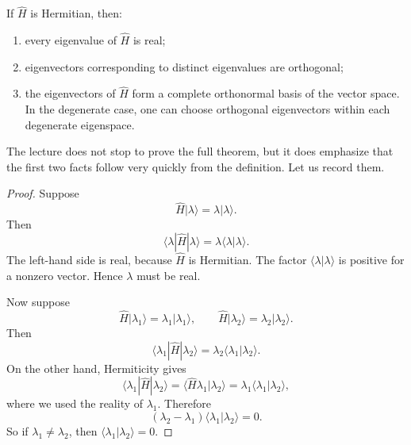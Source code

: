 \begin{theorem}
If \(\hat H\) is Hermitian, then:
\begin{enumerate}
\item every eigenvalue of \(\hat H\) is real;
\item eigenvectors corresponding to distinct eigenvalues are orthogonal;
\item the eigenvectors of \(\hat H\) form a complete orthonormal basis of the vector space. In the degenerate case, one can choose orthogonal eigenvectors within each degenerate eigenspace.
\end{enumerate}
\end{theorem}

The lecture does not stop to prove the full theorem, but it does emphasize that the first two facts follow very quickly from the definition. Let us record them.

\begin{proof}
Suppose
\begin{equation}
\hat H|\lambda\rangle=\lambda|\lambda\rangle.
\end{equation}
Then
\begin{equation}
\langle \lambda|\hat H|\lambda\rangle
=
\lambda \langle \lambda|\lambda\rangle.
\end{equation}
The left-hand side is real, because \(\hat H\) is Hermitian. The factor \(\langle \lambda|\lambda\rangle\) is positive for a nonzero vector. Hence \(\lambda\) must be real.

Now suppose
\begin{equation}
\hat H|\lambda_1\rangle=\lambda_1|\lambda_1\rangle,
\qquad
\hat H|\lambda_2\rangle=\lambda_2|\lambda_2\rangle.
\end{equation}
Then
\begin{equation}
\langle \lambda_1|\hat H|\lambda_2\rangle
=
\lambda_2\langle \lambda_1|\lambda_2\rangle.
\end{equation}
On the other hand, Hermiticity gives
\begin{equation}
\langle \lambda_1|\hat H|\lambda_2\rangle
=
\langle \hat H\lambda_1|\lambda_2\rangle
=
\lambda_1\langle \lambda_1|\lambda_2\rangle,
\end{equation}
where we used the reality of \(\lambda_1\). Therefore
\begin{equation}
(\lambda_2-\lambda_1)\langle \lambda_1|\lambda_2\rangle=0.
\end{equation}
So if \(\lambda_1\neq \lambda_2\), then \(\langle \lambda_1|\lambda_2\rangle=0\).
\end{proof}

